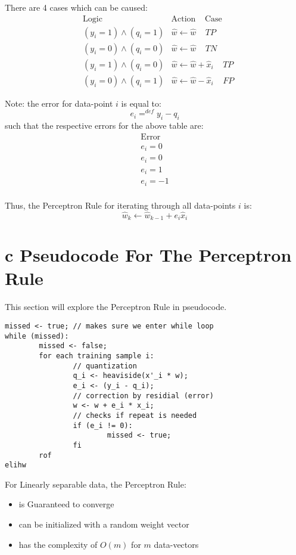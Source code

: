 \documentclass[12pt]{book}
\begin{document}
There are 4 cases which can be caused:
\begin{align*}
        &\text{Logic} &\text{Action}\;\;\;\;\text{Case}\\
        &(y_i = 1) \wedge (q_i = 1) &\hat w \leftarrow \hat w\;\;\;\;TP\\
        &(y_i = 0) \wedge (q_i = 0) &\hat w \leftarrow \hat w\;\;\;\;TN\\
        &(y_i = 1) \wedge (q_i = 0) &\hat w \leftarrow \hat w + \hat x_i\;\;\;\;TP\\
        &(y_i = 0) \wedge (q_i = 1) &\hat w \leftarrow \hat w-\hat x_i\;\;\;\;FP
\end{align*}

Note: the error for data-point $i$ is equal to:
\[e_i =^{def} y_i - q_i\]
such that the respective errors for the above table are:
\begin{align*}
        \text{Error}\\
        e_i = 0\\
        e_i = 0\\
        e_i = 1\\
        e_i = -1\\
\end{align*}

Thus, the Perceptron Rule for iterating through all data-points $i$ is:
\[\hat w_k \leftarrow \hat w_{k-1} + e_i\hat x_i\]
\pagebreak

\section*{c Pseudocode For The Perceptron Rule}
This section will explore the Perceptron Rule in pseudocode.
\begin{verbatim}
missed <- true; // makes sure we enter while loop
while (missed):
        missed <- false;
        for each training sample i:
                // quantization
                q_i <- heaviside(x'_i * w);        
                e_i <- (y_i - q_i);
                // correction by residial (error)
                w <- w + e_i * x_i;
                // checks if repeat is needed
                if (e_i != 0):
                        missed <- true;
                fi
        rof
elihw

\end{verbatim}

For Linearly separable data, the Perceptron Rule:
\begin{itemize}
        \item is Guaranteed to converge
        \item can be initialized with a random weight vector
        \item has the complexity of $O(m)$ for $m$ data-vectors
\end{itemize}
\end{document}
